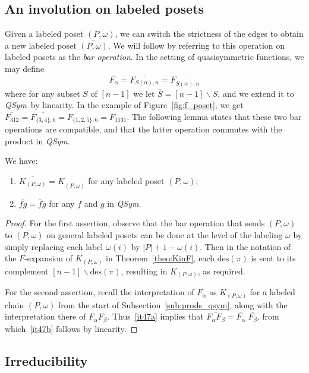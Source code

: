 \documentclass[ALCO,Unicode,published]{cedram}
\newcommand{\qsym}{{\it{QSym}}}
\newcommand{\om}{\omega}
\newcommand{\kpw}{K_{(P,\om)}}
\newcommand{\des}{\mathrm{des}}
\newcommand{\inv}[1]{\overline{#1}}
\begin{document}
\subsection{An involution on labeled posets}

Given a labeled poset $(P,\om)$, we can switch the strictness of the edges to obtain a new labeled poset $\inv{(P,\om)}$.  
We will follow \cite{McWa14} by referring to this operation on labeled posets as the \emph{bar operation}.  In the setting of quasisymmetric functions, we may define 
\[
\inv{F_\alpha} = \inv{F_{S(\alpha),n}} = F_{\inv{S(\alpha)},n}
\]
where for any subset $S$ of $[n-1]$ we let $\inv{S}=[n-1]\backslash S$,  and we extend it to \qsym\ by linearity.  In the example of Figure~\ref{fig:f_poset}, we get $\inv{F_{312}} = \inv{F_{\{3,4\},6}} = F_{\{1,2,5\},6}= F_{1131}$.
The following lemma states that these two bar operations are compatible, and that the latter operation commutes with the product in \qsym.
\begin{lemma}\label{lem:bar}
We have:
\begin{enumerate}[label=(\alph*)]
\item \label{it47a} $\inv{\kpw} = K_{\inv{(P,\om)}}$ for any labeled poset $(P,\om)$;
\item \label{it47b} $\inv{fg}=\inv{f}\inv{g}$ for any $f$ and $g$ in \qsym.
\end{enumerate}
\end{lemma}
\begin{proof}
For the first assertion, observe that the bar operation that sends $(P,\om)$ to $\inv{(P,\om)}$ on general labeled posets can be done at the level of the labeling $\om$ by simply replacing each label $\omega(i)$ by $|P|+1-\om(i)$.  Then in the notation of the $F$-expansion of $\kpw$ in Theorem~\ref{theo:KinF}, each $\des(\pi)$ is sent to its complement $[n-1]\backslash\des(\pi)$, resulting in $\inv{\kpw}$, as required.

For the second assertion, recall the interpretation of $F_\alpha$ as $\kpw$ for a labeled chain $(P,\omega)$ from the start of Subsection~\ref{sub:prods_qsym}, along with the interpretation there of $F_\alpha F_\beta$.
Thus~\ref{it47a} implies that $\inv{F_\alpha F_\beta} = \inv{F_\alpha} \; \inv{F_\beta}$, from which~\ref{it47b} follows by linearity.
\end{proof}

\subsection{Irreducibility}
\end{document}
